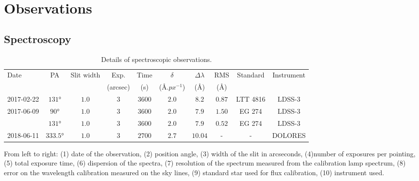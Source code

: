 \documentclass[../main.tex]{subfiles}
\begin{document}
\section{Observations}
\label{sec:obs}

\subsection{Spectroscopy}
\label{sec:obs_spec}

\begin{table}
    \centering
    \caption{Details of spectroscopic observations.}
    \label{tab:obs_spec}
    \small
    \begin{threeparttable}
    \begin{tabular}{lccccccccc}
    \hline
    \hline
    Date& PA &Slit width& Exp.& Time & $\delta$ & $\Delta\lambda$ & RMS &Standard&Instrument\\
    & & & (arcsec) & (s) & ($\si{\angstrom.px^{-1}}$)& ($\si{\angstrom}$)& ($\si{\angstrom}$) & &\\   
    \hline
    2017-02-22 & $\ang{131}$ & $1.0$& $3$ & $3600$ & $2.0$ & $8.2$ & $0.87$ & LTT 4816&LDSS-3\\
    2017-06-09 & $\ang{90}$  & $1.0$&$3$ & $3600$ & $2.0$ & $7.9$ & $1.50$ & EG 274&LDSS-3\\
               & $\ang{131}$ & $1.0$&$3$ & $3600$ & $2.0$ & $7.9$ & $0.52$ & EG 274&LDSS-3\\
    2018-06-11 & $\ang{333.5}$ & $1.0$&$3$ & $2700$& $2.7$ &$10.04$&-&-& DOLORES\\
    \hline
    \end{tabular}
    \normalsize
    \begin{tablenotes}
    \item From left to right: (1) date of the observation, (2) position angle, (3) width of the slit in arcseconds, (4)number of exposures per pointing, (5) total exposure time, (6) dispersion of the spectra, (7) resolution of the spectrum measured from the calibration lamp spectrum, (8) error on the wavelength calibration measured on the sky lines, (9) standard star used for flux calibration, (10) instrument used.
    \end{tablenotes}
    \end{threeparttable}
\end{table}
\end{document}
